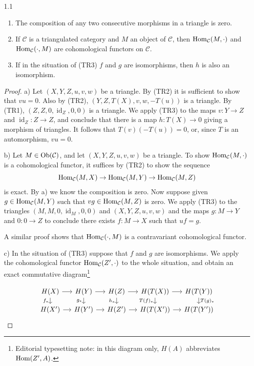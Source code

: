 \begin{bookproposition}{1.1}\label{prop:1.1}
	\begin{enumerate}
		\item[a)] The composition of any two consecutive morphisms in a triangle is zero.
		\item[b)] If $\mathcal{C}$ is a triangulated category and $M$ an object of $\mathcal{C}$, then $\operatorname{Hom}_{\mathcal{C}}(M,\cdot)$ and $\operatorname{Hom}_{\mathcal{C}}(\cdot,M)$ are cohomological functors on $\mathcal{C}$.
		\item[c)] If in the situation of (TR3) $f$ and $g$ are isomorphisms, then $h$ is also an isomorphism.
	\end{enumerate}
\end{bookproposition}

\begin{proof}
	a) Let $(X,Y,Z,u,v,w)$ be a triangle. By (TR2) it is sufficient to show that $vu=0$. Also by (TR2), $(Y,Z,T(X),v,w,-T(u))$ is a triangle. By (TR1), $(Z,Z,0,\operatorname{id}_Z,0,0)$ is a triangle. We apply (TR3) to the maps $v\colon Y\to Z$ and $\operatorname{id}_Z\colon Z\to Z$, and conclude that there is a map $h:T(X)\rightarrow 0$ giving a morphism of triangles. It follows that $T(v)(-T(u))=0$, or, since $T$ is an automorphism, $vu=0$.

	b) Let $M\in \operatorname{Ob}(\mathcal{C})$, and let $(X,Y,Z,u,v,w)$ be a triangle. To show $\operatorname{Hom}_{\mathcal{C}}(M,\cdot)$ is a cohomological functor, it suffices by (TR2) to show the sequence
	\[
	\operatorname{Hom}_{\mathcal{C}}(M,X)\to\operatorname{Hom}_{\mathcal{C}}(M,Y)\to\operatorname{Hom}_{\mathcal{C}}(M,Z)
	\]
	is exact. By a) we know the composition is zero. Now suppose given $g\in\operatorname{Hom}_{\mathcal{C}}(M,Y)$ such that $vg\in \operatorname{Hom}_{\mathcal{C}}(M,Z)$ is zero. We apply (TR3) to the triangles $(M,M,0,\operatorname{id}_M,0,0)$ and $(X,Y,Z,u,v,w)$ and the maps $g\colon M\to Y$ and $0\colon 0\to Z$ to conclude there exists $f\colon M\to X$ such that $uf=g$.

	A similar proof shows that $\operatorname{Hom}_{\mathcal{C}}(\cdot,M)$ is a contravariant cohomological functor.

	c) In the situation of (TR3) suppose that $f$ and $g$ are isomorphisms. We apply the cohomological functor $\operatorname{Hom}_{\mathcal{C}}(Z', \cdot)$ to the whole situation, and obtain an exact commutative diagram\footnote{Editorial typesetting note: in this diagram only, $H(A)$ abbreviates $\operatorname{Hom}(Z',A)$.}

	\[
\begin{tikzcd}[column sep=small,row sep=small]
H(X) \ar[r] \ar[d,"f_*"'] & H(Y) \ar[r] \ar[d,"g_*"']
 & H(Z) \ar[r] \ar[d,"h_*"'] & H(T(X)) \ar[r] \ar[d,"T(f)_*"']
 & H(T(Y)) \ar[d,"T(g)_*"] \\
H(X') \ar[r] & H(Y') \ar[r] & H(Z') \ar[r]
 & H(T(X')) \ar[r] & H(T(Y'))
\end{tikzcd}
\]


\end{proof}
